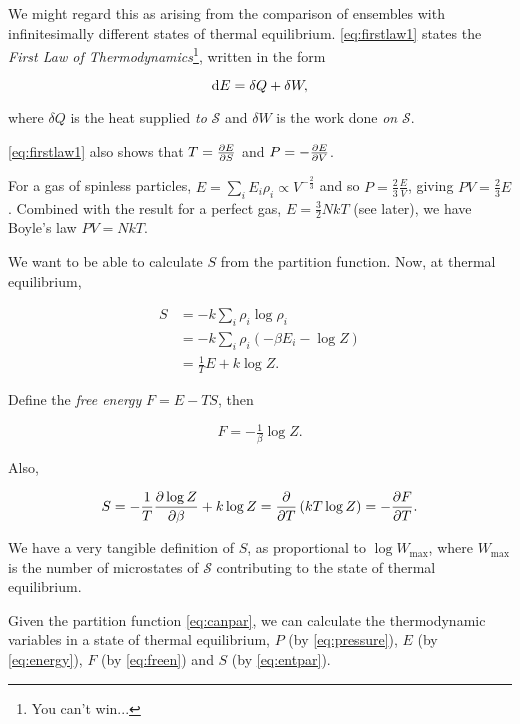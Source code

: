 \documentclass{notes}
\newcommand{\cS}{\mathcal{S}}
\begin{document}
We might regard this as arising from the comparison of ensembles with
infinitesimally different states of thermal equilibrium.
\eqref{eq:firstlaw1} states the \emph{First Law of
  Thermodynamics}\footnote{You can't win...\label{pg:1law}}, written
in the form

\begin{equation}\label{eq:firstlaw}
\mathrm{d} E = \delta Q + \delta W,
\end{equation}

where $\delta Q$ is the heat supplied \emph{to} $\cS$ and $\delta W$ is the
work done \emph{on} $\cS$.

\eqref{eq:firstlaw1} also shows that $T = \frac{\partial E}{\partial S}$ and
$P = -\frac{\partial E}{\partial V}$.

For a gas of spinless particles, $E = \sum_i E_i \rho_i \propto
V^{-\tfrac{2}{3}}$ and so $P = \tfrac{2}{3} \frac{E}{V}$, giving $PV =
\tfrac{2}{3} E$.  Combined with the result for a perfect gas, $E =
\tfrac{3}{2} N k T$ (see later), we have Boyle's law $PV = N k T$.

We want to be able to calculate $S$ from the partition function.  Now,
at thermal equilibrium,

\begin{align*}
S &= - k \sum_i \rho_i \log \rho_i \\
&= -k \sum_i \rho_i \left( - \beta E_i - \log Z \right) \\
&= \frac{1}{T} E + k \log Z.
\end{align*}

Define the \emph{free energy} $F = E - TS$, then

\begin{equation}\label{eq:freen}
F = - \tfrac{1}{\beta} \log Z.
\end{equation}

Also,

\begin{equation}\label{eq:entpar}
S = - \frac{1}{T} \frac{\partial \log Z}{\partial \beta} + k \log Z
= \frac{\partial }{\partial T} \left( k T \log Z \right) = - \frac{\partial F}{\partial T}.
\end{equation}

We have a very tangible definition of $S$, as proportional
to $\log W_{\text{max}}$, where $W_{\text{max}}$ is the number of
microstates of $\cS$ contributing to the state of thermal equilibrium.

Given the partition function \eqref{eq:canpar}, we can calculate
the thermodynamic variables in a state of thermal equilibrium,
$P$ (by \eqref{eq:pressure}), $E$ (by \eqref{eq:energy}),
$F$ (by \eqref{eq:freen}) and $S$ (by \eqref{eq:entpar}).
\end{document}
